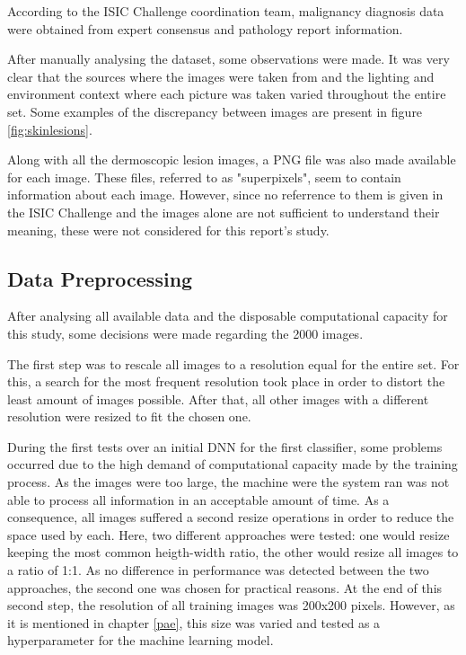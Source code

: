 \documentclass[10pt]{IEEEtran}
\begin{document}
According to the ISIC Challenge coordination team, malignancy diagnosis data were obtained from expert consensus and pathology report information.

After manually analysing the dataset, some observations were made.
It was very clear that the sources where the images were taken from and the lighting and environment context where each picture was taken varied throughout the entire set.
Some examples of the discrepancy between images are present in figure \ref{fig:skinlesions}.

Along with all the dermoscopic lesion images, a PNG file was also made available for each image. 
These files, referred to as "superpixels", seem to contain information about each image. 
However, since no referrence to them is given in the ISIC Challenge and the images alone are not sufficient to understand their meaning, these were not considered for this report's study.
\newpage{}

\subsection{Data Preprocessing}
\label{dp}

After analysing all available data and the disposable computational capacity for this study, some decisions were made regarding the 2000 images.

The first step was to rescale all images to a resolution equal for the entire set. 
For this, a search for the most frequent resolution took place in order to distort the least amount of images possible. 
After that, all other images with a different resolution were resized to fit the chosen one.

During the first tests over an initial DNN for the first classifier, some problems occurred due to the high demand of computational capacity made by the training process.
As the images were too large, the machine were the system ran was not able to process all information in an acceptable amount of time.
As a consequence, all images suffered a second resize operations in order to reduce the space used by each.
Here, two different approaches were tested: one would resize keeping the most common heigth-width ratio, the other would resize all images to a ratio of 1:1.
As no difference in performance was detected between the two approaches, the second one was chosen for practical reasons.
At the end of this second step, the resolution of all training images was 200x200 pixels. 
However, as it is mentioned in chapter \ref{pae}, this size was varied and tested as a hyperparameter for the machine learning model.
\end{document}
